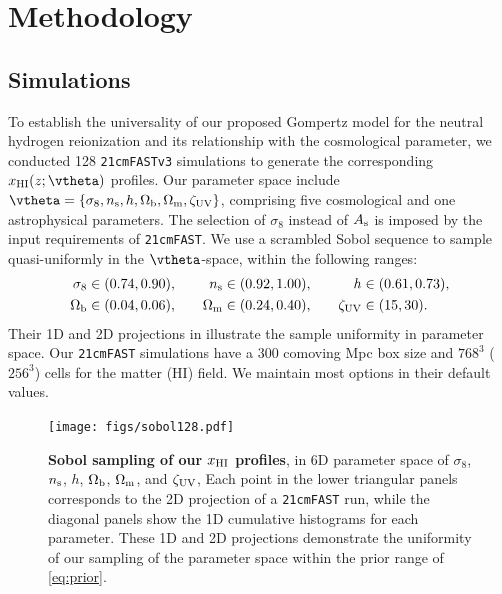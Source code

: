 \section*{Methodology}
\label{sec:methods}




\subsection*{Simulations}
\label{ssec:sims}

To establish the universality of our proposed Gompertz model for the
neutral hydrogen reionization and its relationship with the cosmological
parameter, we conducted 128 \texttt{21cmFASTv3} simulations to generate
the corresponding $x_\HI(z; \vtheta)$ profiles.
Our parameter space include $\vtheta = \{\sigma_8, \ns, h, \Omegab,
\Omegam, \zetaUV\}$, comprising five cosmological and one astrophysical
parameters.
The selection of $\sigma_8$ instead of $A_\mathrm{s}$ is imposed by the input
requirements of \texttt{21cmFAST}.
We use a scrambled Sobol sequence \cite{Sobol1967, Owen1998} to sample
quasi-uniformly in the $\vtheta$-space, within the following ranges:
%
\begin{alignat}{3}
\label{eq:prior}
\sigma_8 &\in (0.74, 0.90), &\quad
n_\mathrm{s} &\in (0.92, 1.00), &\quad
h &\in (0.61, 0.73), \nonumber\\
\Omega_\mathrm{b} &\in (0.04, 0.06), &\quad
\Omega_\mathrm{m} &\in (0.24, 0.40), &\quad
\zeta_\mathrm{UV} &\in (15, 30).
\end{alignat}
%
Their 1D and 2D projections in  illustrate the sample
uniformity in parameter space.
Our \texttt{21cmFAST} simulations have a 300 comoving Mpc box size and
$768^3$ ($256^3$) cells for the matter (HI) field.
We maintain most options in their default values.

\begin{figure}[tb]
\centering
\texttt{[image: figs/sobol128.pdf]}
\caption{\textbf{Sobol sampling of our $x_{\mathrm{HI}}$ profiles}, in 6D
parameter space of $\sigma_8$, $n_\mathrm{s}$, $h$, $\Omega_\mathrm{b}$, $\Omega_\mathrm{m}$, and
$\zeta_\mathrm{UV}$,
Each point in the lower triangular panels corresponds to the 2D
projection of a \texttt{21cmFAST} run, while the diagonal panels show
the 1D cumulative histograms for each parameter.
These 1D and 2D projections demonstrate the uniformity of our sampling
of the parameter space within the prior range of \cref{eq:prior}.}
\label{fig:sobol}
\end{figure}

